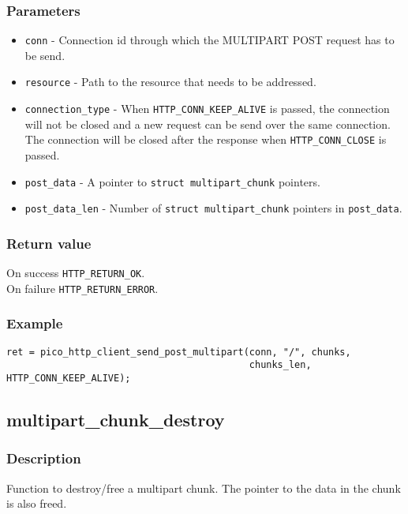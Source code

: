 \subsubsection*{Parameters}
\begin{itemize}[noitemsep]
\item \texttt{conn} - Connection id through which the MULTIPART POST request has to be send.
\item \texttt{resource} - Path to the resource that needs to be addressed.
\item \texttt{connection\_type} - When \texttt{HTTP\_CONN\_KEEP\_ALIVE} is passed, the connection will not be closed and a new request can be send over the same connection. The connection will be closed after the response when \texttt{HTTP\_CONN\_CLOSE} is passed.
\item \texttt{post\_data} - A pointer to \texttt{struct multipart\_chunk} pointers.
\item \texttt{post\_data\_len} - Number of \texttt{struct multipart\_chunk} pointers in \texttt{post\_data}.
\end{itemize}
\subsubsection*{Return value}
On success \texttt{HTTP\_RETURN\_OK}.
\\On failure \texttt{HTTP\_RETURN\_ERROR}.
\subsubsection*{Example}
\begin{verbatim}
ret = pico_http_client_send_post_multipart(conn, "/", chunks,
                                           chunks_len, HTTP_CONN_KEEP_ALIVE);
\end{verbatim}


\subsection{multipart\_chunk\_destroy}

\subsubsection*{Description}
Function to destroy/free a multipart chunk. The pointer to the data in the chunk is also freed.

